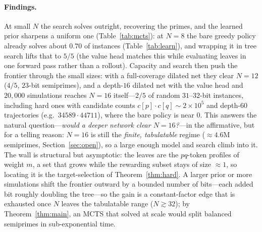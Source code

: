 \documentclass[11pt]{article}
\theoremstyle{definition}
\theoremstyle{plain}
\theoremstyle{remark}
\begin{document}
\paragraph{Findings.}
At small $N$ the search solves outright, recovering the primes, and the learned prior
sharpens a uniform one (Table~\ref{tab:mcts}): at $N=8$ the bare greedy policy already solves
about $0.70$ of instances (Table~\ref{tab:learn}), and wrapping it in tree search lifts that
to $5/5$ (the value head matches this while evaluating leaves in one forward pass rather than
a rollout). Capacity and search then push the frontier through the small sizes: with a
full-coverage dilated net they clear $N=12$ ($4/5$, $23$-bit semiprimes), and a depth-$16$
dilated net with the value head and $20{,}000$ simulations reaches $N=16$ itself---$2/5$ of
random $31$--$32$-bit instances, including hard ones with candidate counts
$c[p]\cdot c[q]\sim 2\times10^{5}$ and depth-$60$ trajectories (e.g.\ $34589\cdot44711$),
where the bare policy is near $0$. This answers the natural question---\emph{would a deeper
network clear $N=16$?}---in the affirmative, but for a telling reason: $N=16$ is still the
\emph{finite, tabulatable} regime ($\approx4.6$M semiprimes, Section~\ref{sec:open}), so a
large enough model and search climb into it. The wall is structural but asymptotic: the
leaves are the $pq$-token profiles of weight $m$, a set that grows while the rewarding subset
stays of size $\approx 1$, so locating it is the target-selection of
Theorem~\ref{thm:hard}. A larger prior or more simulations shift the frontier outward by a
bounded number of bits---each added bit roughly doubling the tree---so the gain is a
constant-factor edge that is exhausted once $N$ leaves the tabulatable range ($N\gtrsim32$);
by Theorem~\ref{thm:main}, an MCTS that solved at scale would split balanced semiprimes in
sub-exponential time.
\end{document}

